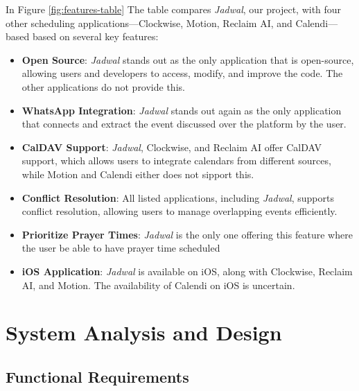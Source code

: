 \documentclass[12pt,a4paper]{report}
\begin{document}
\newpage

In Figure \ref{fig:features-table} The table compares \textit{Jadwal}, our project, with four other scheduling applications—Clockwise, Motion, Reclaim AI, and Calendi—based based on several key features:
\begin{itemize}
    \item \textbf{Open Source}: \textit{Jadwal} stands out as the only application that is open-source, allowing users and developers to access, modify, and improve the code. The other applications do not provide this.
    \item \textbf{WhatsApp Integration}: \textit{Jadwal} stands out again as the only application that connects and extract the event discussed over the platform by the user.
    \item \textbf{CalDAV Support}: \textit{Jadwal}, Clockwise, and Reclaim AI offer CalDAV support, which allows users to integrate calendars from different sources, while Motion and Calendi either does not sipport this.
    \item \textbf{Conflict Resolution}: All listed applications, including \textit{Jadwal}, supports conflict resolution, allowing users to manage overlapping events efficiently.
    \item \textbf{Prioritize Prayer Times}: \textit{Jadwal} is the only one offering this feature where the user be able to have prayer time scheduled
    \item \textbf{iOS Application}: \textit{Jadwal} is available on iOS, along with Clockwise, Reclaim AI, and Motion. The availability of Calendi on iOS is uncertain.
\end{itemize}

\chapter{System Analysis and Design}

\section{Functional Requirements}
\end{document}
